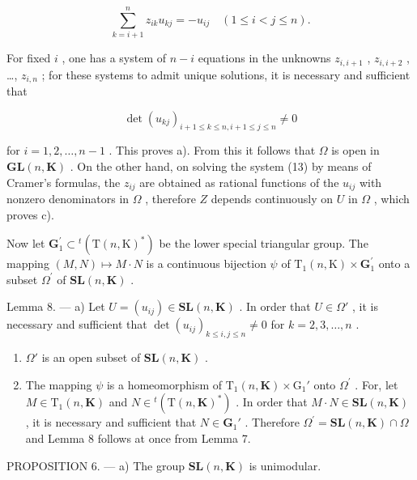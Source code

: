 \[
\sum_ {k = i + 1} ^ {n} z _ {i k} u _ {k j} = - u _ {i j} \quad (1 \leqslant i <   j \leqslant n).\tag{13}
\]

For fixed \(i\) , one has a system of \(n - i\) equations in the unknowns \(z_{i,i+1}\) , \(z_{i,i+2}\) , \ldots, \(z_{i,n}\) ; for these systems to admit unique solutions, it is necessary and sufficient that

\[
\det (u _ {k j}) _ {i + 1 \leqslant k \leqslant n, i + 1 \leqslant j \leqslant n} \neq 0
\]

for \(i = 1,2,\ldots ,n - 1\) . This proves a). From this it follows that \(\Omega\) is open in \(\mathbf{GL}(n,\mathbf{K})\) . On the other hand, on solving the system (13) by means of Cramer's formulas, the \(z_{ij}\) are obtained as rational functions of the \(u_{ij}\) with nonzero denominators in \(\Omega\) , therefore \(Z\) depends continuously on \(U\) in \(\Omega\) , which proves c).

Now let \(\mathbf{G}_{1}^{\prime}\subset{}^{t}(\mathrm{T}(n,\mathrm{K})^{*})\) be the lower special triangular group. The mapping \((M,N)\mapsto M\cdot N\) is a continuous bijection \(\psi\) of \(\mathrm{T}_{1}(n,\mathrm{K})\times\mathbf{G}_{1}^{\prime}\) onto a subset \(\Omega^{\prime}\) of \(\mathbf{SL}(n,\mathbf{K})\) .

Lemma 8. --- a) Let \(U = (u_{ij}) \in \mathbf{SL}(n, \mathbf{K})\) . In order that \(U \in \Omega'\) , it is necessary and sufficient that \(\det(u_{ij})_{k \leqslant i,j \leqslant n} \neq 0\) for \(k = 2,3,\ldots,n\) .

\begin{enumerate}
\def\labelenumi{\alph{enumi})}
\setcounter{enumi}{1}
\item
  \(\Omega'\) is an open subset of \(\mathbf{SL}(n,\mathbf{K})\) .
\item
  The mapping \(\psi\) is a homeomorphism of \(\mathrm{T}_1(n,\mathbf{K})\times \mathrm{G}_1'\) onto \(\Omega^{\prime}\) . For, let \(M\in \mathrm{T}_1(n,\mathbf{K})\) and \(N\in {}^t (\mathrm{T}(n,\mathbf{K})^*)\) . In order that \(M\cdot N\in \mathbf{SL}(n,\mathbf{K})\) , it is necessary and sufficient that \(N\in \mathbf{G}_1'\) . Therefore \(\Omega^{\prime} = \mathbf{SL}(n,\mathbf{K})\cap \Omega\) and Lemma 8 follows at once from Lemma 7.
\end{enumerate}

PROPOSITION 6. --- a) The group \(\mathbf{SL}(n,\mathbf{K})\) is unimodular.

